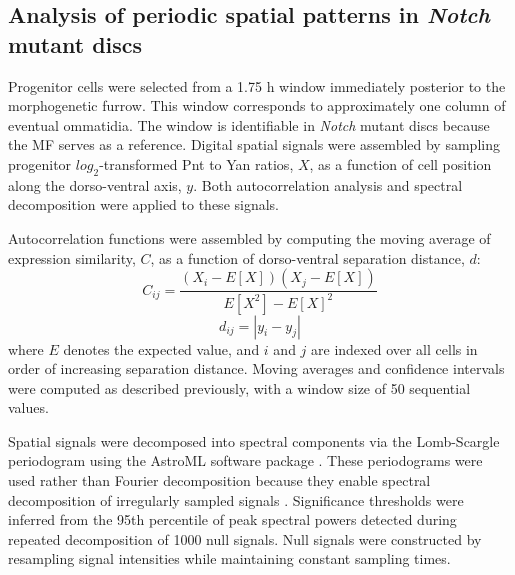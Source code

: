 \subsection{Analysis of periodic spatial patterns in \textit{Notch} mutant discs}
\label{appendix:methods:ratio:autocorrelation}

Progenitor cells were selected from a 1.75 h window immediately posterior to the morphogenetic furrow. This window corresponds to approximately one column of eventual ommatidia. The window is identifiable in \textit{Notch} mutant discs because the MF serves as a reference. Digital spatial signals were assembled by sampling progenitor $log_2$-transformed Pnt to Yan ratios, $X$, as a function of cell position along the dorso-ventral axis, $y$. Both autocorrelation analysis and spectral decomposition were applied to these signals.

Autocorrelation functions were assembled by computing the moving average of expression similarity, $C$, as a function of dorso-ventral separation distance, $d$:
\begin{equation}
C_{ij} = \frac{ (X_i-E[X])(X_j-E[X]) }{ E[X^2] - E[X]^2 }
\end{equation}
\begin{equation}
d_{ij} = | y_i - y_j |
\end{equation}
where $E$ denotes the expected value, and $i$ and $j$ are indexed over all cells in order of increasing separation distance. Moving averages and confidence intervals were computed as described previously, with a window size of 50 sequential values.

Spatial signals were decomposed into spectral components via the Lomb-Scargle periodogram using the AstroML software package \cite{VanderPlas2012}. These periodograms were used rather than Fourier decomposition because they enable spectral decomposition of irregularly sampled signals \cite{VanderPlas2018}. Significance thresholds were inferred from the 95th percentile of peak spectral powers detected during repeated decomposition of 1000 null signals. Null signals were constructed by resampling signal intensities while maintaining constant sampling times.